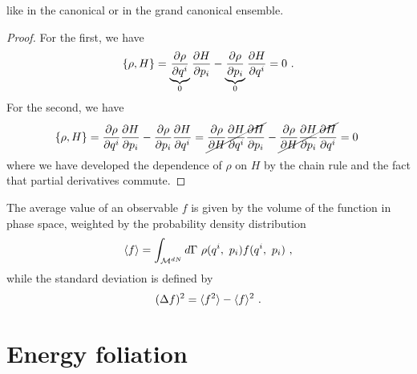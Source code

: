     like in the canonical or in the grand canonical ensemble.
    \begin{proof}
        For the first, we have 
        \begin{equation*}
            \{\rho, H\} = \underbrace{\frac{\partial\rho}{\partial q^i}}_0 \frac{\partial H}{\partial p_i} - \underbrace{\frac{\partial\rho}{\partial p_i}}_0 \frac{\partial H}{\partial q^i} = 0 ~.
        \end{equation*}
        For the second, we have 
        \begin{equation*}
        \begin{aligned}
            \{\rho, H\} = \frac{\partial\rho}{\partial q^i} \frac{\partial H}{\partial p_i} - \frac{\partial\rho}{\partial p_i} \frac{\partial H}{\partial q^i} = \cancel{\frac{\partial\rho}{\partial H} \frac{\partial H}{\partial q^i} \frac{\partial H}{\partial p_i}} - \cancel{\frac{\partial\rho}{\partial H} \frac{\partial H}{\partial p_i} \frac{\partial H}{\partial q^i}} = 0 ~
        \end{aligned}
        \end{equation*}
        where we have developed the dependence of $\rho$ on $H$ by the chain rule and the fact that partial derivatives commute.
    \end{proof}

    The average value of an observable $f$ is given by the volume of the function in phase space, weighted by the probability density distribution
    \begin{equation}\label{cm:av}
        \langle f\rangle = \int_{\mathcal M^{dN}} d\Gamma ~ \rho(q^i, ~p_i) f(q^i, ~p_i) ~,
    \end{equation}
    while the standard deviation is defined by
    \begin{equation*}
        (\Delta f)^2 = \langle f^2\rangle - \langle f\rangle^2 ~.
    \end{equation*}

\section{Energy foliation}

